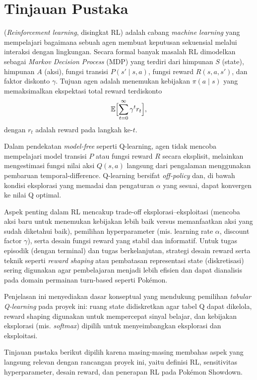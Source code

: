 \documentclass[11pt,a4paper,oneside]{report}
\begin{document}
\section{Tinjauan Pustaka}
(\textit{Reinforcement learning}, disingkat RL) adalah cabang \textit{machine learning} yang mempelajari bagaimana sebuah agen membuat keputusan sekuensial melalui interaksi dengan lingkungan. Secara formal banyak masalah RL dimodelkan sebagai \textit{Markov Decision Process} (MDP) yang terdiri dari himpunan \(S\) (state), himpunan \(A\) (aksi), fungsi transisi \(P(s'\mid s,a)\), fungsi reward \(R(s,a,s')\), dan faktor diskonto \(\gamma\). Tujuan agen adalah menemukan kebijakan \(\pi(a\mid s)\) yang memaksimalkan ekspektasi total reward terdiskonto
\[
\mathbb{E}\Bigl[\sum_{t=0}^{\infty} \gamma^{t} r_t\Bigr],
\]
dengan \(r_t\) adalah reward pada langkah ke-\(t\). 

Dalam pendekatan \textit{model-free} seperti Q-learning, agen tidak mencoba mempelajari model transisi \(P\) atau fungsi reward \(R\) secara eksplisit, melainkan mengestimasi fungsi nilai aksi \(Q(s,a)\) langsung dari pengalaman menggunakan pembaruan temporal-difference. Q-learning bersifat \textit{off-policy} dan, di bawah kondisi eksplorasi yang memadai dan pengaturan \(\alpha\) yang sesuai, dapat konvergen ke nilai Q optimal. 

Aspek penting dalam RL mencakup trade-off eksplorasi–eksploitasi (mencoba aksi baru untuk menemukan kebijakan lebih baik versus memanfaatkan aksi yang sudah diketahui baik), pemilihan hyperparameter (mis. learning rate \(\alpha\), discount factor \(\gamma\)), serta desain fungsi reward yang stabil dan informatif. Untuk tugas episodik (dengan terminal) dan tugas berkelanjutan, strategi desain reward serta teknik seperti \textit{reward shaping} atau pembatasan representasi state (diskretisasi) sering digunakan agar pembelajaran menjadi lebih efisien dan dapat dianalisis pada domain permainan turn-based seperti Pokémon.

Penjelasan ini menyediakan dasar konseptual yang mendukung pemilihan \textit{tabular Q-learning} pada proyek ini: ruang state didiskretkan agar tabel Q dapat dikelola, reward shaping digunakan untuk mempercepat sinyal belajar, dan kebijakan eksplorasi (mis. \textit{softmax}) dipilih untuk menyeimbangkan eksplorasi dan eksploitasi.

Tinjauan pustaka berikut dipilih karena masing-masing membahas aspek yang langsung relevan dengan rancangan proyek ini, yaitu definisi RL, sensitivitas hyperparameter, desain reward, dan penerapan RL pada Pokémon Showdown.
\end{document}
